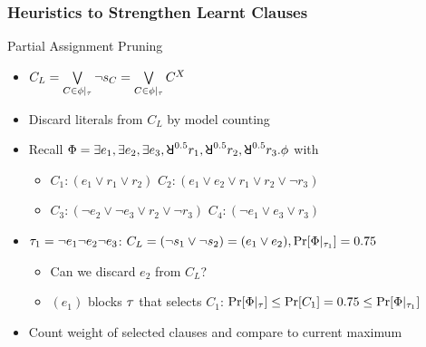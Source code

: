 \begin{frame}
    \frametitle{Heuristics to Strengthen Learnt Clauses}
    \begin{block}{Partial Assignment Pruning}
        \begin{itemize}
            \item $C_L=\bigvee\limits_{C\in\phi|_{\tau}}\lnot s_{C}=\bigvee\limits_{C\in\phi|_{\tau}}C^X$
                  \pause
            \item Discard literals from $C_L$ by model counting
                  \pause
            \item Recall $\Qf=\exists e_1,\exists e_2,\exists e_3,\random{0.5} r_1,\random{0.5} r_2,\random{0.5} r_3.\pf$ with
                  \begin{itemize}
                      \item[] $C_1: (e_1 \lor r_1 \lor r_2)$ $C_2: (e_1 \lor e_2 \lor r_1 \lor r_2 \lor \lnot r_3)$
                      \item[] $C_3: (\lnot e_2 \lor \lnot e_3 \lor r_2 \lor \lnot r_3)$ $C_4: (\lnot e_1 \lor e_3 \lor r_3)$
                  \end{itemize}
                  \pause
            \item $\tau_1=\lnot e_1 \lnot e_2 \lnot e_3$: $C_L=(\lnot s_1\lor\lnot s_2)=(e_1\lor e_2),\Pr[\Phi|_{\tau_1}]=0.75$
                  \pause
                  \begin{itemize}
                      \item Can we discard $e_2$ from $C_L$?
                            \pause
                      \item $(e_1)$ blocks $\tau$ that selects $C_1$: $\Pr[\Phi|_{\tau}]\leq\Pr[C_1]=0.75\leq\Pr[\Phi|_{\tau_1}]$
                            \pause
                  \end{itemize}
            \item Count weight of selected clauses and compare to current maximum
        \end{itemize}
    \end{block}
\end{frame}

